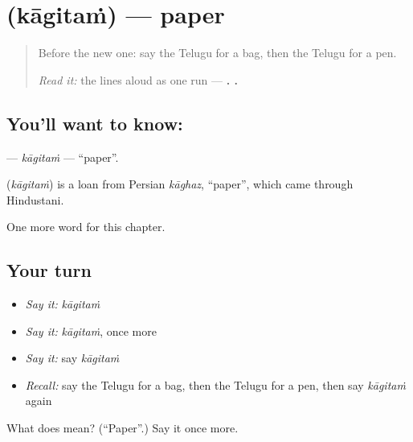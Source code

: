 \section[\texorpdfstring{\te{కాగితం} (kāgitaṁ)}{కాగితం (kāgitaṁ)}]{ (kāgitaṁ) — paper}

\label{lesson:TE-C112-kagitam}



\begin{quote}
Before the new one: say the Telugu for a bag, then the Telugu for a pen.

\emph{Read it:} the lines aloud as one run — \textbf{ .   .}
\end{quote}

\subsection*{You'll want to know: }
\textbf{} — \emph{kāgitaṁ} — \textquotedblleft{}paper\textquotedblright{}.

\begin{cousinweb}
\textbf{} (\emph{kāgitaṁ}) is a loan from Persian \emph{kāghaz}, \textquotedblleft{}paper\textquotedblright{}, which came through Hindustani.
\end{cousinweb}

\begin{grammarlens}[title={What you've built}]
One more word for this chapter.
\end{grammarlens}

\subsection*{Your turn}
\begin{itemize}
\raggedright
  \item \emph{Say it:} \emph{kāgitaṁ}
  \item \emph{Say it:} \emph{kāgitaṁ}, once more
  \item \emph{Say it:} say \emph{kāgitaṁ}
  \item \emph{Recall:} say the Telugu for a bag, then the Telugu for a pen, then say \emph{kāgitaṁ} again
\end{itemize}

\begin{tcolorbox}[breakable,colback=teal!4,colframe=teal!35!black,title={Before you move on}]
What does  mean? (\textquotedblleft{}Paper\textquotedblright{}.) Say it once more.
\end{tcolorbox}
